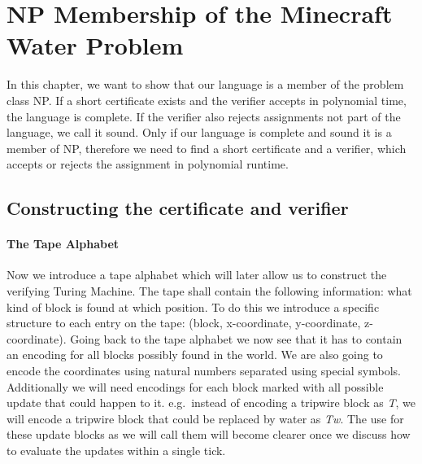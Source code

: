 \section{NP Membership of the Minecraft Water Problem}
	In this chapter, we want to show that our language is a member of the problem class NP. If a short certificate exists and the verifier accepts in polynomial time, the language is complete. If the verifier also rejects assignments not part of the language, we call it sound. Only if our language is complete and sound it is a member of NP, therefore we need to find a short certificate and a verifier, which accepts or rejects the assignment in polynomial runtime.
	
	\subsection{Constructing the certificate and verifier}
	\paragraph{The Tape Alphabet}
	Now we introduce a tape alphabet which will later allow us to construct the verifying Turing Machine. 
	The tape shall contain the following information: what kind of block is found at which position.
	To do this we introduce a specific structure to each entry on the tape: (block, x-coordinate, y-coordinate, z-coordinate).
	Going back to the tape alphabet we now see that it has to contain an encoding for all blocks possibly found in the world.
	We are also going to encode the coordinates using natural numbers separated using special symbols.
	Additionally we will need encodings for each block marked with all possible update that could happen to it. 
	e.g.\ instead of encoding a tripwire block as \emph{T}, we will encode a tripwire block that could be replaced by water as \emph{Tw}.
	The use for these update blocks as we will call them will become clearer once we discuss how to evaluate the updates within a single tick.


